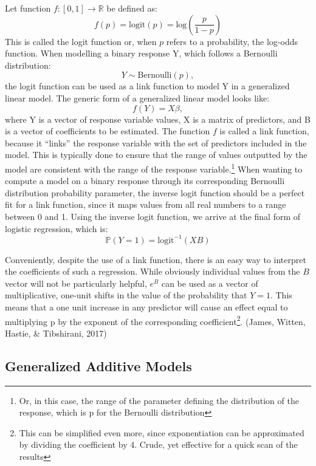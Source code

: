 \documentclass[12pt,twoside]{reedthesis}
\begin{document}
  Let function \(f : [0, 1] \to \mathbb{R}\) be defined as:
  \[f(p) = \text{logit}(p) = \text{log}\left( \frac{p}{1-p} \right)\] This
  is called the logit function or, when \(p\) refers to a probability, the
  log-odds function. When modelling a binary response Y, which follows a
  Bernoulli distribution: \[Y \sim \text{Bernoulli}(p),\] the logit
  function can be used as a link function to model Y in a generalized
  linear model. The generic form of a generalized linear model looks
  like:\\
  \[f(Y) = X\beta ,\] where Y is a vector of response variable values, X
  is a matrix of predictors, and B is a vector of coefficients to be
  estimated. The function \(f\) is called a link function, because it
  ``links'' the response variable with the set of predictors included in
  the model. This is typically done to ensure that the range of values
  outputted by the model are consistent with the range of the response
  variable.\footnote{Or, in this case, the range of the parameter defining
    the distribution of the response, which is p for the Bernoulli
    distribution} When wanting to compute a model on a binary response
  through its corresponding Bernoulli distribution probability parameter,
  the inverse logit function should be a perfect fit for a link function,
  since it maps values from all real numbers to a range between 0 and 1.
  Using the inverse logit function, we arrive at the final form of
  logistic regression, which is:\\
  \[\mathbb{P} (Y = 1) = \text{logit}^{-1} (XB)\]
  
  Conveniently, despite the use of a link function, there is an easy way
  to interpret the coefficients of such a regression. While obviously
  individual values from the \(B\) vector will not be particularly
  helpful, \(e^B\) can be used as a vector of multiplicative, one-unit
  shifts in the value of the probability that \(Y = 1\). This means that a
  one unit increase in any predictor will cause an effect equal to
  multiplying p by the exponent of the corresponding coefficient\footnote{This
    can be simplified even more, since exponentiation can be approximated
    by dividing the coefficient by 4. Crude, yet effective for a quick
    scan of the results}. (James, Witten, Hastie, \& Tibshirani, 2017)
  
  \subsection{Generalized Additive
  Models}\label{generalized-additive-models}
  
\end{document}
